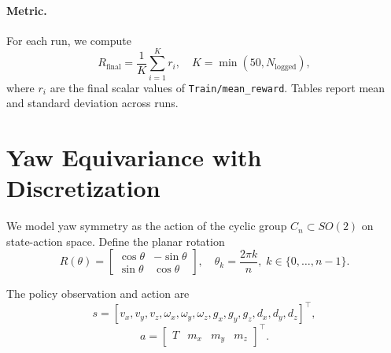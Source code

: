 \documentclass{article}
\begin{document}
\paragraph{Metric.}
For each run, we compute
\begin{equation}
R_{\mathrm{final}} = \frac{1}{K}\sum_{i=1}^{K} r_i, \quad K=\min(50, N_{\mathrm{logged}}),
\end{equation}
where $r_i$ are the final scalar values of \texttt{Train/mean\_reward}. Tables report mean and standard deviation across runs.

\section{Yaw Equivariance with Discretization}
We model yaw symmetry as the action of the cyclic group $C_n\subset SO(2)$ on state-action space.
Define the planar rotation
\begin{equation}
R(\theta)=
\begin{bmatrix}
\cos\theta & -\sin\theta\\
\sin\theta & \cos\theta
\end{bmatrix},
\quad
\theta_k=\frac{2\pi k}{n},\;k\in\{0,\ldots,n-1\}.
\end{equation}

The policy observation and action are
\begin{equation}
s=[v_x,v_y,v_z,\omega_x,\omega_y,\omega_z,g_x,g_y,g_z,d_x,d_y,d_z]^{\top},
\end{equation}
\begin{equation}
a=\begin{bmatrix}T&m_x&m_y&m_z\end{bmatrix}^{\top}.
\end{equation}
\end{document}

